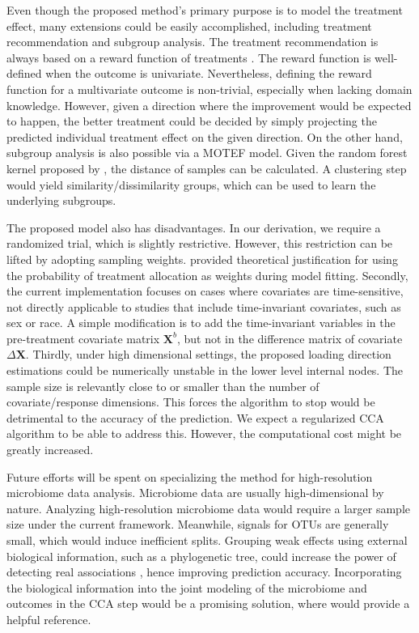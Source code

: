 \documentclass[smallextended]{svjour3}
\begin{document}
Even though the proposed method's primary purpose is to model the treatment effect, many extensions could be easily accomplished, including treatment recommendation and subgroup analysis. The treatment recommendation is always based on a reward function of treatments \citep{qian2011performance}. The reward function is well-defined when the outcome is univariate. Nevertheless, defining the reward function for a multivariate outcome is non-trivial, especially when lacking domain knowledge. However, given a direction where the improvement would be expected to happen, the better treatment could be decided by simply projecting the predicted individual treatment effect on the given direction. On the other hand, subgroup analysis is also possible via a MOTEF model. Given the random forest kernel proposed by \cite{davies2014random}, the distance of samples can be calculated. A clustering step would yield similarity/dissimilarity groups, which can be used to learn the underlying subgroups.

The proposed model also has disadvantages. In our derivation, we require a randomized trial, which is slightly restrictive. However, this restriction can be lifted by adopting sampling weights. \citep{tian2014simple} provided theoretical justification for using the probability of treatment allocation as weights during model fitting. Secondly, the current implementation focuses on cases where covariates are time-sensitive, not directly applicable to studies that include time-invariant covariates, such as sex or race. A simple modification is to add the time-invariant variables in the pre-treatment covariate matrix $\textbf{X}^b$, but not in the difference matrix of covariate $\Delta \textbf{X}$. Thirdly, under high dimensional settings, the proposed loading direction estimations could be numerically unstable in the lower level internal nodes. The sample size is relevantly close to or smaller than the number of covariate/response dimensions. This forces the algorithm to stop would be detrimental to the accuracy of the prediction. We expect a regularized CCA algorithm to be able to address this. However, the computational cost might be greatly increased. 

Future efforts will be spent on specializing the method for high-resolution microbiome data analysis. Microbiome data are usually high-dimensional by nature. Analyzing high-resolution microbiome data would require a larger sample size under the current framework. Meanwhile, signals for OTUs are generally small, which would induce inefficient splits. Grouping weak effects using external biological information, such as a phylogenetic tree, could increase the power of detecting real associations \citep{peterson2016joint}, hence improving prediction accuracy. Incorporating the biological information into the joint modeling of the microbiome and outcomes in the CCA step would be a promising solution, where \citet{chen2013structure} would provide a helpful reference. 
\end{document}
